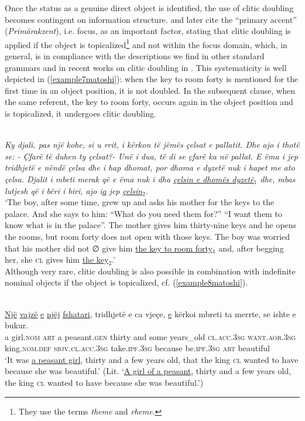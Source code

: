 \documentclass[output=paper]{langsci/langscibook}
\begin{document}
Once the status as a genuine direct object is identified, the use of clitic doubling becomes contingent on information structure. \citet[192]{Buchholz1977} and later \citet[440]{Buchholz1987} cite the \enquote{primary accent} (\textit{Primärakzent}), i.e. focus, as an important factor, stating that clitic doubling is applied if the object is topicalized\footnote{They use the terms \textit{theme} and \textit{rheme}.} and not within the focus domain, which, in general, is in compliance with the descriptions we find in other standard grammars \citep{Agalliu2002} and in recent works on clitic doubling in  \citep{Kallulli2016}. This systematicity is well depicted in (\ref{example7matoshi}): when the key to room forty is mentioned for the first time in an object position, it is not doubled. In the subsequent clause, when the same referent, the key to room forty, occurs again in the object position and is topicalized, it undergoes clitic doubling.

\ea \label{example7matoshi} 
	\\
	\textit{Ky djali, pas një kohe, si u rrit, i kërkon të jëmës çelsat e pallatit. Dhe ajo i thotë se: - Çfarë të duhen ty çelsat?- Unë i dua, të di se çfarë ka në pallat. E ëma i jep tridhjetë e nëndë çelsa dhe i hap dhomat, por dhoma e dyzetë nuk i hapet me ato çelsa. Djalit i mbeti merak që e ëma nuk i dha \uline{çelsin e dhomës dyzetë$_1$} dhe, mbas lutjesh që i bëri i biri, ajo i\uline{a} jep \uline{çelsin$_2$}.}\\
	\glt ‘The boy, after some time, grew up and asks his mother for the keys to the palace. And she says to him: \enquote{What do you need them for?} \enquote{I want them to know what is in the palace}. The mother gives him thirty-nine keys and he opens the rooms, but room forty does not open with those keys. The boy was worried that his mother did not ∅ give him \uline{the key to room forty$_1$} and, after begging her, she \textsc{cl} gives him \uline{the key$_2$}.’\\
 \z
Although very rare, clitic doubling is also possible in combination with indefinite nominal objects if the object is topicalized, cf. (\ref{example8matoshi}).


\ea \label{example8matoshi}
	\\
	\gll \uline{Një} \uline{vajzë} \uline{e} \uline{njëj} \uline{fshatari}, tridhjetë e ca vjeçe, \uline{e} kërkoi mbreti ta merrte, se ishte e bukur.\\
	a girl.\textsc{nom} \textsc{art} a peasant.\textsc{gen} thirty and some years\_old \textsc{cl.acc.3sg} \textsc{want.\textsc{aor.3sg}} king\textsc{.nom.def} \textsc{sbjv.cl.acc.3sg} take.\textsc{ipf.3sg} because be.\textsc{ipf.3sg} \textsc{art} beautiful\\
	\glt ‘It was \uline{a peasant girl}, thirty and a few years old, that the king \textsc{cl} wanted to have because she was beautiful.’ (Lit. ‘\uline{A girl of a peasant}, thirty and a few years old, the king \textsc{cl} wanted to have because she was beautiful.’)
\z
\end{document}
